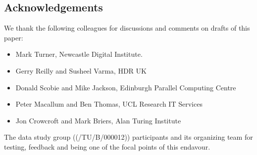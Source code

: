 \documentclass[10pt,a4paper,twocolumn]{article}
\begin{document}
\subsection*{Acknowledgements}

We thank the following colleagues for discussions and comments on drafts of this paper: 

\begin{itemize}
    \item Mark Turner, Newcastle Digital Institute.
    \item Gerry Reilly and Susheel Varma, HDR UK
    \item Donald Scobie and Mike Jackson, Edinburgh Parallel Computing Centre
    \item Peter Macallum and Ben Thomas, UCL Research IT Services
    \item Jon Crowcroft and Mark Briers, Alan Turing Institute
\end{itemize}
The data study group ((/TU/B/000012)) participants and its organizing team for testing, feedback and being one of the focal points of this endavour.

{\small
}

\bigskip







\end{document}
